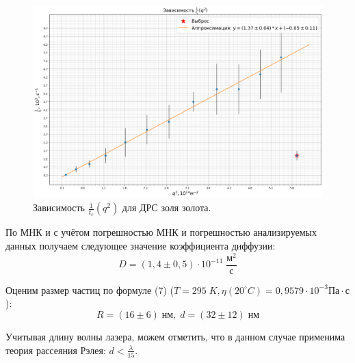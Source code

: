 \documentclass{article}
\begin{document}
\newpage
\begin{figure}[h!]
\centering
    \includegraphics[width=0.8\linewidth]{Images/Сера 1.png}
    \caption{Зависимость $\frac{1}{t_c}(q^2)$ для ДРС золя золота.}
    \label{fig: Сера 1}
\end{figure}
По МНК и с учётом погрешностью МНК и погрешностью анализируемых данных получаем следующее значение коэффициента диффузии:
$$D = (1,4 \pm 0,5) \cdot 10^{-11} \; \frac{\text{м}^2}{\text{с}}$$


Оценим размер частиц по формуле (7) ($T = 295\; K, \eta(20^{\circ}C) = 0,9579 \cdot 10^{-3} \text{Па} \cdot \text{с}$):
$$R = (16 \pm 6)\;\text{нм}, \; d = (32 \pm 12) \;\text{нм}$$


Учитывая длину волны лазера, можем отметить, что в данном случае применима теория рассеяния Рэлея: $d < \frac{\lambda}{15}$.
\end{document}
